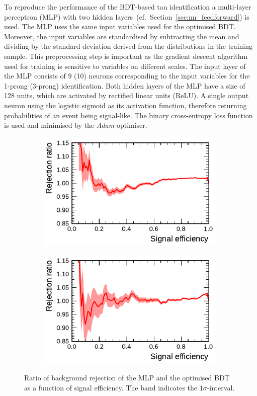 To reproduce the performance of the BDT-based tau identification a multi-layer
perceptron (MLP) with two hidden layers~(cf.\ Section~\ref{sec:nn_feedforward})
is used. The MLP uses the same input variables used for the optimised BDT.
Moreover, the input variables are standardised by subtracting the mean and
dividing by the standard deviation derived from the distributions in the
training sample. This preprocessing step is important as the gradient descent
algorithm used for training is sensitive to variables on different scales. The
input layer of the MLP consists of 9 (10) neurons corresponding to the input
variables for the 1-prong (3-prong) identification. Both hidden layers of the
MLP have a size of 128 units, which are activated by rectified linear units
(ReLU). A single output neuron using the logistic sigmoid as its activation
function, therefore returning probabilities of an event being signal-like. The
binary cross-entropy loss function is used and minimised by the \emph{Adam}
optimiser.

\begin{figure}[htb]
  \begin{subfigure}[t]{0.48\textwidth}
    \centering
    \includegraphics{./figures/rnn/mlp/mlp_bdt_ratio_1p.pdf}
  \end{subfigure}\hfill
  \begin{subfigure}[t]{0.48\textwidth}
    \centering
    \includegraphics{./figures/rnn/mlp/mlp_bdt_ratio_3p.pdf}
  \end{subfigure}
  \caption{Ratio of background rejection of the MLP and the optimised BDT as a
    function of signal efficiency. The band indicates the $1\sigma$-interval.}
  \label{fig:roc_mlp_bdt_comparison}
\end{figure}

